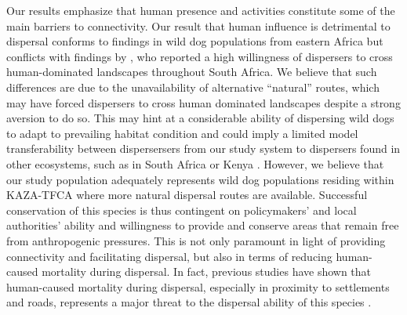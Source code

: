 \documentclass[abstract=on,10pt,a4paper,bibliography=totocnumbered]{article}
\begin{document}
Our results emphasize that human presence and activities constitute some of the
main barriers to connectivity. Our result that human influence is detrimental to
dispersal conforms to findings in wild dog populations from eastern Africa
\citep{Masenga.2016, Oneill.2020} but conflicts with findings by
\cite{DaviesMostert.2012}, who reported a high willingness of dispersers to
cross human-dominated landscapes throughout South Africa. We believe that such
differences are due to the unavailability of alternative ``natural'' routes,
which may have forced dispersers to cross human dominated landscapes despite a
strong aversion to do so. This may hint at a considerable ability of dispersing
wild dogs to adapt to prevailing habitat condition and could imply a limited
model transferability between dispersersers from our study system to dispersers
found in other ecosystems, such as in South Africa \citep{Whittington.2011,
DaviesMostert.2012} or Kenya \citep{Woodroffe.2019, Oneill.2020}. However, we
believe that our study population adequately represents wild dog populations
residing within KAZA-TFCA where more natural dispersal routes are available.
Successful conservation of this species is thus contingent on policymakers' and
local authorities' ability and willingness to provide and conserve areas that
remain free from anthropogenic pressures. This is not only paramount in light of
providing connectivity and facilitating dispersal, but also in terms of reducing
human-caused mortality during dispersal. In fact, previous studies have shown
that human-caused mortality during dispersal, especially in proximity to
settlements and roads, represents a major threat to the dispersal ability of
this species \citep{Woodroffe.2019, Cozzi.2020}.
\end{document}
